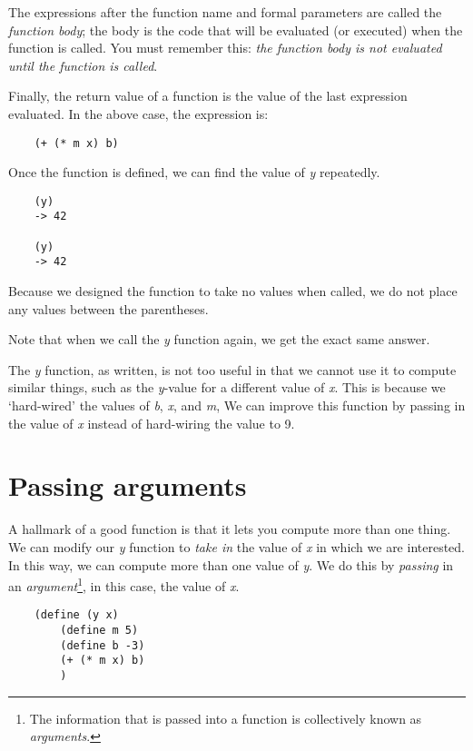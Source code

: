 The expressions after the function name and formal parameters
are called the {\it function body}; the body
is the code that will be evaluated (or executed) when the
function is called. You must remember this: {\it the function body
is not evaluated until the function is called}.

Finally, the return value of a function is the value of the
last expression evaluated. In the above case, the
expression is:

\begin{verbatim}
    (+ (* m x) b)
\end{verbatim}

Once the function is defined, we can find the value of {\it y} repeatedly.

\begin{verbatim}
    (y)
    -> 42

    (y)
    -> 42
\end{verbatim}

Because we designed the
function to take no values when called, we do not place any
values between the parentheses.

Note that when we call the {\it y} function again,
we get the exact same answer.

The {\it y} function, as written,
is not too useful in that we cannot use it to compute
similar things, such as the {\it y}-value for a different value of
{\it x}.
This is because we `hard-wired' the values of {\it b}, {\it x}, and {\it m},
We can improve this function by passing in the value of {\it x}
instead of hard-wiring the value to 9.

\section{Passing arguments}

A hallmark of a good function is that it lets you compute
more than one thing. We can modify our {\it y} function to {\it take in} the
value of {\it x} in which we are interested.
In this way,
we can compute more than one value of {\it y}.
We do this by {\it passing} in 
an {\it argument}\footnote{
The information that is passed into a function is collectively
known as {\it arguments}.}, in this case, the value of {\it x}.

\begin{verbatim}
    (define (y x)
        (define m 5)
        (define b -3)
        (+ (* m x) b)
        )
\end{verbatim}

